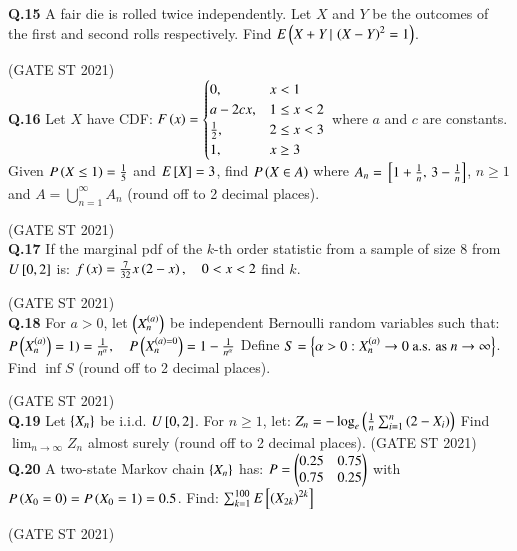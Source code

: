 \documentclass[journal,12pt,onecolumn]{IEEEtran}
\theoremstyle{remark}
\begin{document}
\textbf{Q.15}
A fair die is rolled twice independently.  
Let $X$ and $Y$ be the outcomes of the first and second rolls respectively.  
Find $E\left(X + Y \, | \, \left(X - Y\right)^2 = 1\right)$.

\hfill (GATE ST 2021) \\

\textbf{Q.16}
Let $X$ have CDF:
$
F\brak{x} =
\begin{cases}
    
0, & x < 1 \\
a - 2c x, & 1 \le x < 2 \\
\frac12, & 2 \le x < 3 \\
1, & x \ge 3
\end{cases}
$
where $a$ and $c$ are constants.  
Given $P\brak{X \leq 1} = \frac15$ and $E\sbrak{X} = 3$,  
find $P\brak{X \in A}$ where $A_n = \sbrak{1+\frac1n,\, 3 - \frac1n}$, $n \ge 1$ and $A = \bigcup_{n=1}^\infty A_n$ (round off to 2 decimal places).

\hfill (GATE ST 2021) \\


\textbf{Q.17}
If the marginal pdf of the $k$-th order statistic from a sample of size 8 from $U{}\left[0,2\right]$ is:
$
f\left(x\right) = \frac{7}{32} x \left(2-x\right), \quad 0 < x < 2
$
find $k$.

\hfill (GATE ST 2021) \\

\textbf{Q.18}
For $a > 0$, let $\left( X_n^{\left(a\right)} \right)$ be independent Bernoulli random variables such that:
$
P\left(X_n^{\left(a\right)}\right) = 1) = \frac{1}{n^\alpha}, \quad P\left(X_n^{\left(a\right) = 0}\right) = 1 - \frac{1}{n^\alpha}
$
Define $S = \left\{ \alpha > 0 : X_n^{\left(a\right)} \to 0 \ \text{a.s. as} \ n \to \infty \right\}$.  
Find $\inf S$ (round off to 2 decimal places).

\hfill (GATE ST 2021) \\

\textbf{Q.19}
Let $\left\{X_n\right\}$ be i.i.d. $U{}\left[0,2\right]$. For $n \ge 1$, let:
$
Z_n = - \log_e \left( \frac{1}{n} \sum_{i=1}^n \left(2 - X_i\right) \right)
$
Find $\lim_{n \to \infty} Z_n$ almost surely (round off to 2 decimal places).
\hfill (GATE ST 2021) \\

\textbf{Q.20}
A two-state Markov chain $\left\{X_n\right\}$ has:
$
P = \begin{pmatrix} 0.25 & 0.75 \\ 0.75 & 0.25 \end{pmatrix}
$
with $P\left(X_0 = 0\right) = P\left(X_0 = 1\right) = 0.5$. Find:
$
\sum_{k=1}^{100} E{}\left[\left(X_{2k}\right)^{2k}\right]
$

\hfill (GATE ST 2021) \\
\end{document}
